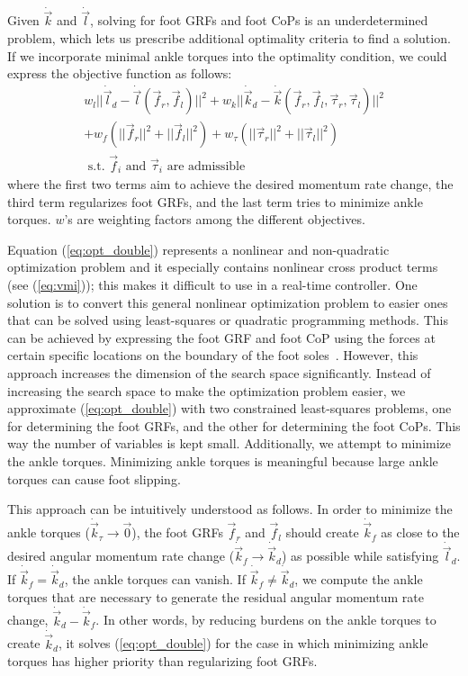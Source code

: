 \documentclass{llncs}
\newcommand{\vtau}{\vec{\tau}}
\newcommand{\vzero}{{\vec{0}}}
\newcommand{\vf}{\vec{f}}
\newcommand{\vdk} {\dot{\vec{k}}}
\newcommand{\vdl} {\dot{\vec{l}}}
\begin{document}
Given $\vdk$ and $\vdl$, solving for foot GRFs and foot CoPs
is an underdetermined problem, which lets us prescribe additional optimality
criteria to find a solution.
If we incorporate minimal ankle torques into the optimality condition,
we could express the objective function as follows:
\begin{equation}
\begin{split}
	w_l ||\vdl_d - \vdl(\vf_r,\vf_l)||^2 + w_k ||\vdk_d - \vdk(\vf_r,\vf_l,\vtau_r,\vtau_l)||^2 \\
	+ w_f \left( ||\vf_r||^2+||\vf_l||^2 \right)
	+ w_\tau \left( ||\vtau_r||^2+||\vtau_l||^2 \right) \\
	\text{~s.t. $\vf_i$ and $\vtau_i$ are admissible}
\end{split}
\label{eq:opt_double}
\end{equation}
where the first two terms aim to achieve the desired momentum rate change,
the third term regularizes foot GRFs, and the last term tries to minimize ankle torques.
$w$'s are weighting factors among the different objectives.

Equation (\ref{eq:opt_double}) represents a nonlinear and non-quadratic
optimization problem and it especially contains nonlinear
cross product terms (see (\ref{eq:vmi})); this makes it difficult to use in a real-time controller. 
One solution is to convert this general nonlinear optimization problem
to easier ones that can be solved using least-squares or
quadratic programming methods. This can be achieved by
expressing the foot GRF and foot CoP
using the forces at certain specific locations on the boundary of the foot soles~\cite{Pollard01, Hyon07}.
However, this approach increases the dimension of the search space
significantly. %
Instead of increasing the search space to make the optimization problem
easier, we approximate (\ref{eq:opt_double}) with
two constrained least-squares problems, one for determining the foot GRFs, and
the other for determining the foot CoPs. This way the number
of variables is kept small.
Additionally, we attempt to minimize the ankle torques.
Minimizing ankle torques is meaningful because
large ankle torques can cause foot slipping.

This approach can be intuitively understood as follows.
In order to minimize the ankle torques ($\vdk_\tau\rightarrow\vzero$),
the foot GRFs $\vf_r$ and $\vf_l$ should create $\vdk_f$ as close to
the desired angular momentum rate change ($\vdk_f\rightarrow\vdk_d$) as possible while satisfying $\vdl_d$.
If $\vdk_f=\vdk_d$, the ankle torques can vanish.
If $\vdk_f\neq \vdk_d$, we compute the ankle torques that are necessary to generate
the residual angular momentum rate change, $\vdk_d-\vdk_f$.
In other words, by reducing burdens on the ankle torques to create $\vdk_d$,
it solves (\ref{eq:opt_double}) for the case in which minimizing ankle torques has higher priority
than regularizing foot GRFs.
\end{document}
